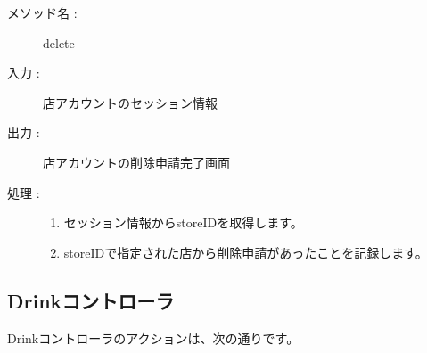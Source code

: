 \documentclass[a4j,titlepage]{jarticle}
\begin{document}
\begin{description}
  \item [メソッド名 :] delete
  \item [入力 :] 店アカウントのセッション情報
  \item [出力 :] 店アカウントの削除申請完了画面
  \item [処理 :]\mbox{}
  \begin{enumerate}
    \item セッション情報からstoreIDを取得します。
    \item storeIDで指定された店から削除申請があったことを記録します。
  \end{enumerate}
\end{description}

\subsection{Drinkコントローラ}
Drinkコントローラのアクションは、次の通りです。
\end{document}
